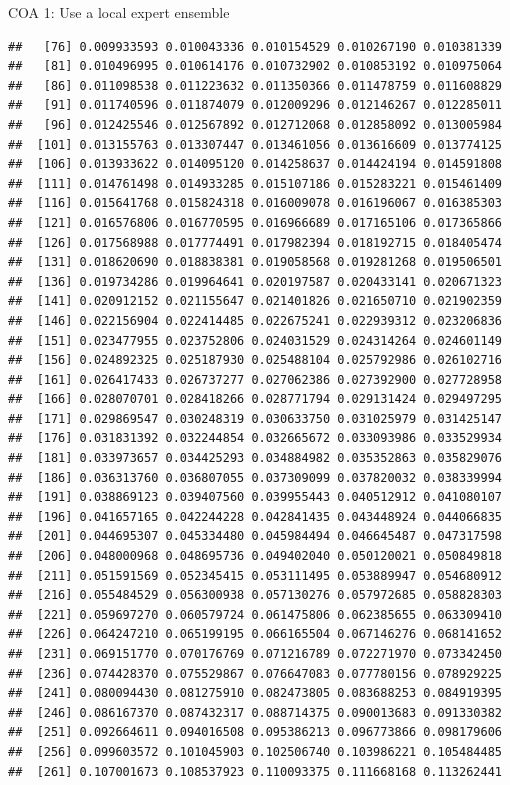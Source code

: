 \documentclass[ignorenonframetext,]{beamer}
\begin{document}
\begin{frame}[fragile]{COA 1: Use a local expert ensemble}
\begin{verbatim}
##   [76] 0.009933593 0.010043336 0.010154529 0.010267190 0.010381339
##   [81] 0.010496995 0.010614176 0.010732902 0.010853192 0.010975064
##   [86] 0.011098538 0.011223632 0.011350366 0.011478759 0.011608829
##   [91] 0.011740596 0.011874079 0.012009296 0.012146267 0.012285011
##   [96] 0.012425546 0.012567892 0.012712068 0.012858092 0.013005984
##  [101] 0.013155763 0.013307447 0.013461056 0.013616609 0.013774125
##  [106] 0.013933622 0.014095120 0.014258637 0.014424194 0.014591808
##  [111] 0.014761498 0.014933285 0.015107186 0.015283221 0.015461409
##  [116] 0.015641768 0.015824318 0.016009078 0.016196067 0.016385303
##  [121] 0.016576806 0.016770595 0.016966689 0.017165106 0.017365866
##  [126] 0.017568988 0.017774491 0.017982394 0.018192715 0.018405474
##  [131] 0.018620690 0.018838381 0.019058568 0.019281268 0.019506501
##  [136] 0.019734286 0.019964641 0.020197587 0.020433141 0.020671323
##  [141] 0.020912152 0.021155647 0.021401826 0.021650710 0.021902359
##  [146] 0.022156904 0.022414485 0.022675241 0.022939312 0.023206836
##  [151] 0.023477955 0.023752806 0.024031529 0.024314264 0.024601149
##  [156] 0.024892325 0.025187930 0.025488104 0.025792986 0.026102716
##  [161] 0.026417433 0.026737277 0.027062386 0.027392900 0.027728958
##  [166] 0.028070701 0.028418266 0.028771794 0.029131424 0.029497295
##  [171] 0.029869547 0.030248319 0.030633750 0.031025979 0.031425147
##  [176] 0.031831392 0.032244854 0.032665672 0.033093986 0.033529934
##  [181] 0.033973657 0.034425293 0.034884982 0.035352863 0.035829076
##  [186] 0.036313760 0.036807055 0.037309099 0.037820032 0.038339994
##  [191] 0.038869123 0.039407560 0.039955443 0.040512912 0.041080107
##  [196] 0.041657165 0.042244228 0.042841435 0.043448924 0.044066835
##  [201] 0.044695307 0.045334480 0.045984494 0.046645487 0.047317598
##  [206] 0.048000968 0.048695736 0.049402040 0.050120021 0.050849818
##  [211] 0.051591569 0.052345415 0.053111495 0.053889947 0.054680912
##  [216] 0.055484529 0.056300938 0.057130276 0.057972685 0.058828303
##  [221] 0.059697270 0.060579724 0.061475806 0.062385655 0.063309410
##  [226] 0.064247210 0.065199195 0.066165504 0.067146276 0.068141652
##  [231] 0.069151770 0.070176769 0.071216789 0.072271970 0.073342450
##  [236] 0.074428370 0.075529867 0.076647083 0.077780156 0.078929225
##  [241] 0.080094430 0.081275910 0.082473805 0.083688253 0.084919395
##  [246] 0.086167370 0.087432317 0.088714375 0.090013683 0.091330382
##  [251] 0.092664611 0.094016508 0.095386213 0.096773866 0.098179606
##  [256] 0.099603572 0.101045903 0.102506740 0.103986221 0.105484485
##  [261] 0.107001673 0.108537923 0.110093375 0.111668168 0.113262441

\end{verbatim}
\end{frame}
\end{document}
